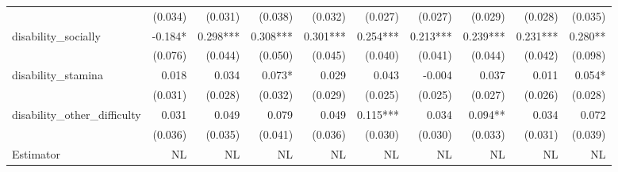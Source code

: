\begin{tabular}{lrrrrrrrrr}
                             &                        (0.034) &                     (0.031) &                         (0.038) &                          (0.032) &                     (0.027) &                     (0.027) &                         (0.029) &                          (0.028) &                    (0.035) \\ 
disability_socially          &                        -0.184* &                    0.298*** &                        0.308*** &                         0.301*** &                    0.254*** &                    0.213*** &                        0.239*** &                         0.231*** &                    0.280** \\ 
                             &                        (0.076) &                     (0.044) &                         (0.050) &                          (0.045) &                     (0.040) &                     (0.041) &                         (0.044) &                          (0.042) &                    (0.098) \\ 
disability_stamina           &                          0.018 &                       0.034 &                          0.073* &                            0.029 &                       0.043 &                      -0.004 &                           0.037 &                            0.011 &                     0.054* \\ 
                             &                        (0.031) &                     (0.028) &                         (0.032) &                          (0.029) &                     (0.025) &                     (0.025) &                         (0.027) &                          (0.026) &                    (0.028) \\ 
disability_other_difficulty  &                          0.031 &                       0.049 &                           0.079 &                            0.049 &                    0.115*** &                       0.034 &                         0.094** &                            0.034 &                      0.072 \\ 
                             &                        (0.036) &                     (0.035) &                         (0.041) &                          (0.036) &                     (0.030) &                     (0.030) &                         (0.033) &                          (0.031) &                    (0.039) \\ 
\midrule
Estimator                    &                             NL &                          NL &                              NL &                               NL &                          NL &                          NL &                              NL &                               NL &                         NL \\ 

\end{tabular}

